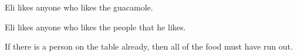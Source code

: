 \begin{practiceproblems}
\begin{problemslist}
		\item[] 
		\item Eli likes anyone who likes the guacamole.
		\item[] 
		\item Eli likes anyone who likes the people that he likes.
		\item[] 
		\item If there is a person on the table already, then all of the food must have run out.
		\item[] 
	\end{problemslist}
	

\end{practiceproblems}
